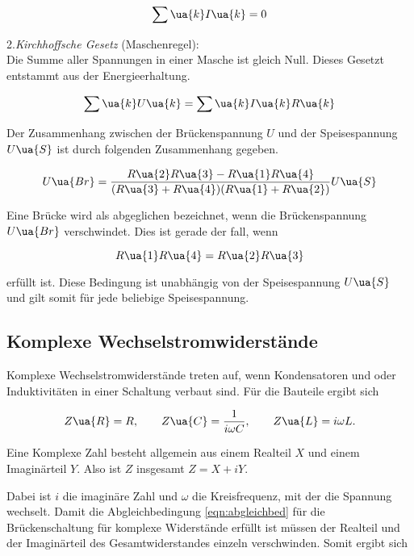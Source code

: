 \begin{equation}
  \label{eqn:Kirchhoff1}
  \sum\ua{k} I\ua{k} = 0
\end{equation}

2.\emph{Kirchhoffsche Gesetz} (Maschenregel):\\
Die Summe aller Spannungen in einer Masche ist gleich Null.
Dieses Gesetzt entstammt aus der Energieerhaltung.

\begin{equation}
  \label{eqn:Krichhoff2}
  \sum\ua{k}U\ua{k} = \sum\ua{k}I\ua{k}R\ua{k}
\end{equation}

Der Zusammenhang zwischen der Brückenspannung $U$ und der Speisespannung $U\ua{S}$
ist durch folgenden Zusammenhang gegeben.

\begin{equation}
  \label{eqn:BrückenUndSpeisespannung}
  U\ua{Br} = \frac{R\ua{2}R\ua{3} - R\ua{1}R\ua{4}}{(R\ua{3} + R\ua{4})(R\ua{1} + R\ua{2})}U\ua{S}
\end{equation}

Eine Brücke wird als abgeglichen bezeichnet, wenn die Brückenspannung $U\ua{Br}$ verschwindet.
Dies ist gerade der fall, wenn

\begin{equation}
  \label{eqn:abgleichbed}
  R\ua{1}R\ua{4} = R\ua{2}R\ua{3}
\end{equation}

erfüllt ist.
Diese Bedingung ist unabhängig von der Speisespannung $U\ua{S}$
und gilt somit für jede beliebige Speisespannung.

\subsection{Komplexe Wechselstromwiderstände}

Komplexe Wechselstromwiderstände treten auf, wenn Kondensatoren und oder Induktivitäten
in einer Schaltung verbaut sind. Für die Bauteile ergibt sich

\begin{equation*}
  Z\ua{R} = R, \qquad Z\ua{C} = \frac{1}{i\omega C}, \qquad Z\ua{L} = i\omega L.
\end{equation*}

Eine Komplexe Zahl besteht allgemein aus einem Realteil $X$ und einem Imaginärteil
$Y$. Also ist $Z$ insgesamt $Z = X + iY$.

Dabei ist $i$ die imaginäre Zahl und $\omega$ die Kreisfrequenz, mit der die
Spannung wechselt. Damit die Abgleichbedingung \eqref{eqn:abgleichbed} für die
Brückenschaltung für komplexe Widerstände erfüllt ist müssen der Realteil und der
Imaginärteil des Gesamtwiderstandes einzeln verschwinden. Somit ergibt sich

